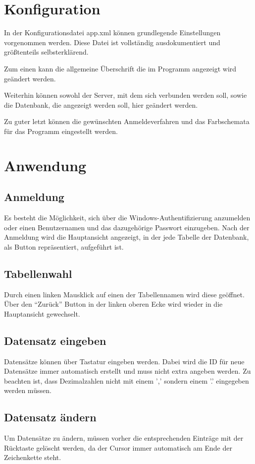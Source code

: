\chapter{Konfiguration}
	In der Konfigurationsdatei app.xml können grundlegende Einstellungen
	vorgenommen werden. Diese Datei ist vollständig ausdokumentiert und
	größtenteils selbsterklärend.
	
	Zum einen kann die allgemeine Überschrift die im Programm angezeigt wird
	geändert werden.
	
	Weiterhin können sowohl der Server, mit dem sich verbunden werden soll, sowie
	die Datenbank, die angezeigt werden soll, hier geändert werden.
	
	Zu guter letzt können die gewünschten Anmeldeverfahren und das Farbschemata für
	das Programm eingestellt werden.
	
	
\chapter{Anwendung}
	\section{Anmeldung}
		Es besteht die Möglichkeit, sich über die Windows-Authentifizierung anzumelden
		oder einen Benutzernamen und das dazugehörige Passwort einzugeben.
		Nach der Anmeldung wird die Hauptansicht angezeigt, in der jede Tabelle der
		Datenbank, als Button repräsentiert, aufgeführt ist.
		
	\section{Tabellenwahl}
		Durch einen linken Mausklick auf einen der Tabellennamen wird diese geöffnet.
		Über den ``Zurück'' Button in der linken oberen Ecke wird wieder in die
		Hauptansicht gewechselt.
		
	\section{Datensatz eingeben}
		Datensätze können über Tastatur eingeben werden. Dabei wird die ID für
		neue Datensätze immer automatisch erstellt und muss nicht extra angeben
		werden.
		Zu beachten ist, dass Dezimalzahlen nicht mit einem ',' sondern einem '.'
		eingegeben werden müssen.
		
	\section{Datensatz ändern}
		Um Datensätze zu ändern, müssen vorher die entsprechenden Einträge mit der
		Rücktaste gelöscht werden, da der Cursor immer automatisch am Ende der
		Zeichenkette steht.
		
